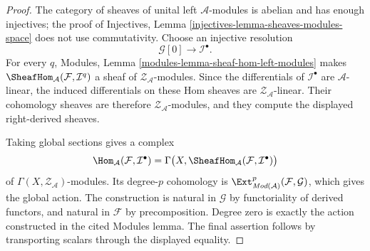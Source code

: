 \begin{proof}
The category of sheaves of unital left $\mathcal A$-modules is abelian and
has enough injectives; the proof of Injectives, Lemma
\ref{injectives-lemma-sheaves-modules-space} does not use commutativity.
Choose an injective resolution
\[
\mathcal G[0]\longrightarrow\mathcal I^\bullet.
\]
For every $q$, Modules, Lemma
\ref{modules-lemma-sheaf-hom-left-modules} makes
$\SheafHom_{\mathcal A}(\mathcal F,\mathcal I^q)$ a sheaf of
$\mathcal Z_{\mathcal A}$-modules. Since the differentials of
$\mathcal I^\bullet$ are $\mathcal A$-linear, the induced differentials on
these Hom sheaves are $\mathcal Z_{\mathcal A}$-linear. Their cohomology
sheaves are therefore $\mathcal Z_{\mathcal A}$-modules, and they compute
the displayed right-derived sheaves.

Taking global sections gives a complex
\[
\Hom_{\mathcal A}(\mathcal F,\mathcal I^\bullet)
=
\Gamma\bigl(X,
\SheafHom_{\mathcal A}(\mathcal F,\mathcal I^\bullet)\bigr)
\]
of $\Gamma(X,\mathcal Z_{\mathcal A})$-modules. Its degree-$p$ cohomology is
$\Ext^p_{\textit{Mod}(\mathcal A)}(\mathcal F,\mathcal G)$, which gives the
global action. The construction is natural in $\mathcal G$ by functoriality
of derived functors, and natural in $\mathcal F$ by precomposition. Degree
zero is exactly the action constructed in the cited Modules lemma. The final
assertion follows by transporting scalars through the displayed equality.
\end{proof}

